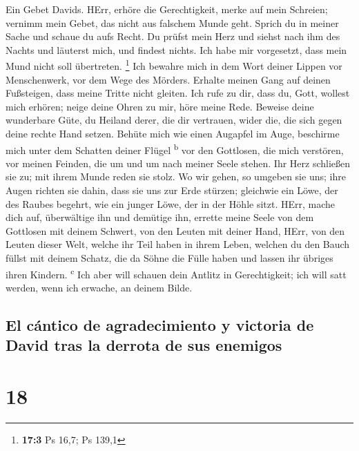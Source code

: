  Ein Gebet Davids. HErr, erhöre die Gerechtigkeit, merke
auf mein Schreien; vernimm mein Gebet, das nicht aus falschem Munde
geht.  Sprich du in meiner Sache und schaue du aufs Recht.
 Du prüfst mein Herz und siehst nach ihm des Nachts und
läuterst mich, und findest nichts. Ich habe mir vorgesetzt, dass mein
Mund nicht soll übertreten. \footnote{\textbf{17:3} Ps 16,7; Ps 139,1}
 Ich bewahre mich in dem Wort deiner Lippen vor
Menschenwerk, vor dem Wege des Mörders.  Erhalte meinen
Gang auf deinen Fußsteigen, dass meine Tritte nicht gleiten.
 Ich rufe zu dir, dass du, Gott, wollest mich erhören;
neige deine Ohren zu mir, höre meine Rede.  Beweise deine
wunderbare Güte, du Heiland derer, die dir vertrauen, wider die, die
sich gegen deine rechte Hand setzen.  Behüte mich wie
einen Augapfel im Auge, beschirme mich unter dem Schatten deiner Flügel
\textsuperscript{b}  vor den Gottlosen, die mich
verstören, vor meinen Feinden, die um und um nach meiner Seele stehen.
 Ihr Herz schließen sie zu; mit ihrem Munde reden sie
stolz.  Wo wir gehen, so umgeben sie uns; ihre Augen
richten sie dahin, dass sie uns zur Erde stürzen; 
gleichwie ein Löwe, der des Raubes begehrt, wie ein junger Löwe, der in
der Höhle sitzt.  HErr, mache dich auf, überwältige ihn
und demütige ihn, errette meine Seele von dem Gottlosen mit deinem
Schwert,  von den Leuten mit deiner Hand, HErr, von den
Leuten dieser Welt, welche ihr Teil haben in ihrem Leben, welchen du den
Bauch füllst mit deinem Schatz, die da Söhne die Fülle haben und lassen
ihr übriges ihren Kindern. \textsuperscript{c}  Ich aber
will schauen dein Antlitz in Gerechtigkeit; ich will satt werden, wenn
ich erwache, an deinem Bilde.

\hypertarget{el-cuxe1ntico-de-agradecimiento-y-victoria-de-david-tras-la-derrota-de-sus-enemigos}{%
\subsection{El cántico de agradecimiento y victoria de David tras la
derrota de sus
enemigos}\label{el-cuxe1ntico-de-agradecimiento-y-victoria-de-david-tras-la-derrota-de-sus-enemigos}}

\hypertarget{section-17}{%
\section{18}\label{section-17}}

